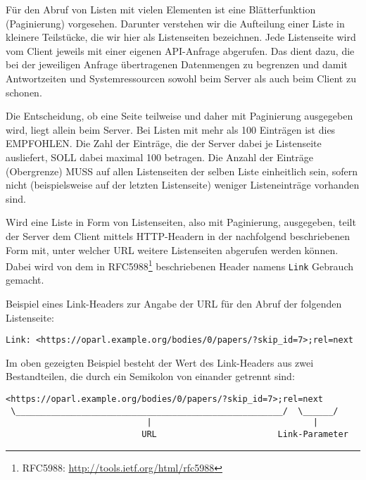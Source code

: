 \documentclass[,a4paper]{article}
\begin{document}

Für den Abruf von Listen mit vielen Elementen ist eine Blätterfunktion
(Paginierung) vorgesehen. Darunter verstehen wir die Aufteilung einer
Liste in kleinere Teilstücke, die wir hier als Listenseiten bezeichnen.
Jede Listenseite wird vom Client jeweils mit einer eigenen API-Anfrage
abgerufen. Das dient dazu, die bei der jeweiligen Anfrage übertragenen
Datenmengen zu begrenzen und damit Antwortzeiten und Systemressourcen
sowohl beim Server als auch beim Client zu schonen.

Die Entscheidung, ob eine Seite teilweise und daher mit Paginierung
ausgegeben wird, liegt allein beim Server. Bei Listen mit mehr als 100
Einträgen ist dies EMPFOHLEN. Die Zahl der Einträge, die der Server
dabei je Listenseite ausliefert, SOLL dabei maximal 100 betragen. Die
Anzahl der Einträge (Obergrenze) MUSS auf allen Listenseiten der selben
Liste einheitlich sein, sofern nicht (beispielsweise auf der letzten
Listenseite) weniger Listeneinträge vorhanden sind.

Wird eine Liste in Form von Listenseiten, also mit Paginierung,
ausgegeben, teilt der Server dem Client mittels HTTP-Headern in der
nachfolgend beschriebenen Form mit, unter welcher URL weitere
Listenseiten abgerufen werden können. Dabei wird von dem in
RFC5988\footnote{RFC5988: \url{http://tools.ietf.org/html/rfc5988}}
beschriebenen Header namens \texttt{Link} Gebrauch gemacht.

Beispiel eines Link-Headers zur Angabe der URL für den Abruf der
folgenden Listenseite:

\begin{verbatim}
Link: <https://oparl.example.org/bodies/0/papers/?skip_id=7>;rel=next
\end{verbatim}

Im oben gezeigten Beispiel besteht der Wert des Link-Headers aus zwei
Bestandteilen, die durch ein Semikolon von einander getrennt sind:

\begin{verbatim}
<https://oparl.example.org/bodies/0/papers/?skip_id=7>;rel=next
 \_____________________________________________________/  \______/
                            |                                |
                           URL                        Link-Parameter
\end{verbatim}
\end{document}
